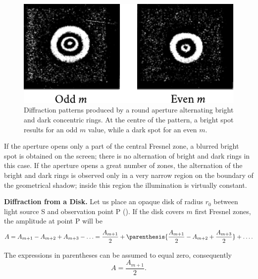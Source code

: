 \begin{figure}[!htb]
	\begin{center}
		\includegraphics[scale=0.9]{figures/ch_18/fig_18_12.pdf}
        \caption[]{Diffraction patterns produced by a round aperture alternating bright and dark concentric rings. At the centre of the pattern, a bright spot results for an odd $m$ value, while a dark spot for an even $m$.}
		\label{fig:18_12}
	\end{center}
	\vspace{-0.8cm}
\end{figure}

If the aperture opens only a part of the central Fresnel zone, a blurred bright spot is obtained on the screen; there is no alternation of bright and dark rings in this case.
If the aperture opens a great number of zones, the alternation of the bright and dark rings is observed only in a very narrow region on the boundary of the geometrical shadow; inside this region the illumination is virtually constant.

\textbf{Diffraction from a Disk.}
Let us place an opaque disk of radius $r_0$ between light source S and observation point P ().
If the disk covers $m$ first Fresnel zones, the amplitude at point P will be
\begin{equation*}
	A = A_{m+1} - A_{m+2} + A_{m+3} - \ldots = \frac{A_{m+1}}{2} + \parenthesis{ \frac{A_{m+1}}{2} - A_{m+2} + \frac{A_{m+3}}{2} } + \ldots .
\end{equation*}

\noindent
The expressions in parentheses can be assumed to equal zero, consequently
\vspace{-12pt}
\begin{equation}\label{eq:18_16}
	A = \frac{A_{m+1}}{2}.
\end{equation}

